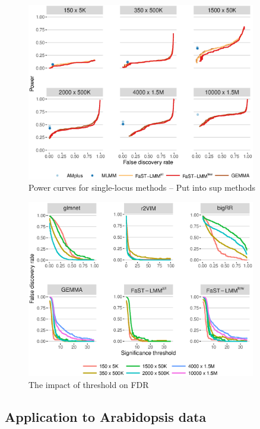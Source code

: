 \documentclass[12pt]{article}
\begin{document}
\begin{figure}
\label{fig_power_single}
\caption{Power curves for single-locus methods -- Put into sup methods}
\includegraphics[width=10cm]{powerSingle}
\end{figure}


\begin{figure}
\label{fig_threshold}
\caption{The impact of threshold on FDR }
\includegraphics[width=10cm]{threshold}
\end{figure}




\subsection{Application to Arabidopsis data}
\end{document}
